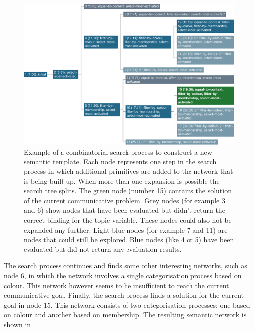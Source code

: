 \begin{figure}[htbp]
  \begin{center}
    \includegraphics[width=\textwidth]{./composition/figures/composition-colour.pdf}
    \caption[Example of a combinatorial search process to construct a
    new semantic template]{Example of a combinatorial search process
      to construct a new semantic template. Each node represents one
      step in the search process in which additional primitives are
      added to the network that is being built up. When more than one
      expansion is possible the search tree splits. The green node
      (number 15) contains the solution of the current communicative
      problem. Grey nodes (for example 3 and 6) show nodes that have
      been evaluated but didn't return the correct binding for the
      topic variable. These nodes could also not be expanded any
      further. Light blue nodes (for example 7 and 11) are nodes that
      could still be explored. Blue nodes (like 4 or 5) have been
      evaluated but did not return any evaluation results.}
    \label{f:composition-colour}
  \end{center}
\end{figure}

The search process continues and finds some other interesting
networks, such as node 6, in which the network involves a single
categorisation process based on colour. This network however seems to
be insufficient to reach the current communicative goal. Finally, the
search process finds a solution for the current goal in node 15. This
network consists of two categorisation processes: one based on colour
and another based on membership. The resulting semantic network is
shown in .

